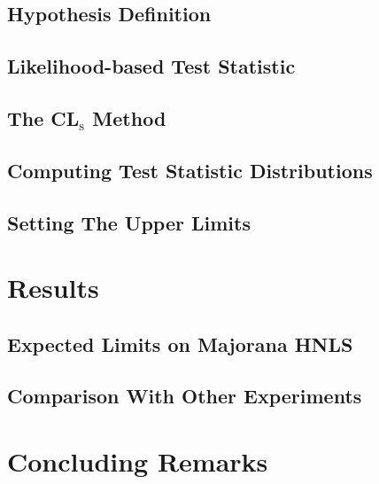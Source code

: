\subsection{Hypothesis Definition}

\subsection{Likelihood-based Test Statistic}

\subsection{The CL$_{\mathrm{s}}$ Method}

\subsection{Computing Test Statistic Distributions}

\subsection{Setting The Upper Limits}

\section{Results}

\subsection{Expected Limits on Majorana HNLS}

\subsection{Comparison With Other Experiments}

\section{Concluding Remarks}
